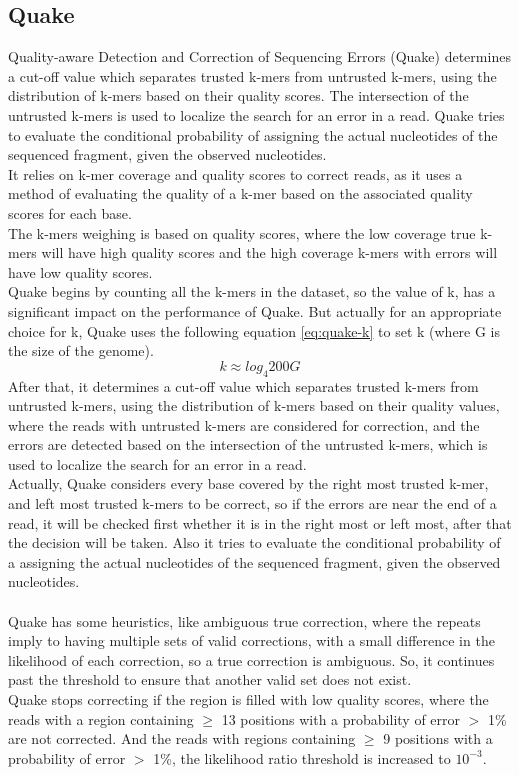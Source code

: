 \documentclass[12pt,openany]{llncs}
\begin{document}
\subsection{Quake}
Quality-aware Detection and Correction of Sequencing Errors (Quake) \cite{Quake} determines a cut-off value which separates trusted k-mers from untrusted k-mers, using the distribution of k-mers based on their quality scores. The intersection of the untrusted k-mers is used to localize the search for an error in a read. Quake tries to evaluate the conditional probability of assigning the actual nucleotides of the sequenced fragment, given the observed nucleotides.
\\
It relies on k-mer coverage and quality scores to correct reads, as it uses a method of evaluating the quality of a k-mer based on the associated quality scores for each base. 
\\
The k-mers weighing is based on quality scores, where the low coverage true k-mers will have high quality scores and the high coverage k-mers with errors will have low quality scores.
\\
Quake begins by counting all the k-mers in the dataset, so the value of k, has a significant impact on the performance of Quake. But actually for an appropriate choice for k, Quake uses the following equation \ref{eq:quake-k} to set k (where G is the size of the genome).
\begin{equation} \label{eq:quake-k}
 k \approx log_{4} 200G  
\end{equation}
After that, it determines a cut-off value which separates trusted k-mers from untrusted k-mers, using the distribution of k-mers based on their quality values, where the reads with untrusted k-mers are considered for correction, and the errors are detected based on the intersection of the untrusted k-mers, which is used to localize the search for an error in a read. 
\\
Actually, Quake considers every base covered by the right most trusted k-mer, and left most trusted k-mers to be correct, so if the errors are near the end of a read, it will be checked first whether it is in the right most or left most, after that the decision will be taken. Also it tries to evaluate the conditional probability of a assigning the actual nucleotides of the sequenced fragment, given the observed nucleotides.
\\
\\
Quake has some heuristics, like ambiguous true correction, where the repeats imply to having multiple sets of valid corrections, with a small difference in the likelihood of each correction, so a true correction is ambiguous. So, it continues past the threshold to ensure that another valid set does not exist. 
\\
Quake stops correcting if the region is filled with low quality scores, where the reads with a region containing $\geq$ 13 positions with a probability of error $>$ 1\% are not corrected. And the reads with regions containing $\geq$ 9 positions with a probability of error $>$ 1\%, the likelihood ratio threshold is increased to $10^{-3}$.
\end{document}
